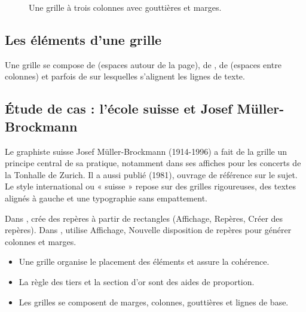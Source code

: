 \begin{figure}[ht]
\centering
{}
\caption{Une grille à trois colonnes avec gouttières et marges.}
\end{figure}

\subsection{Les éléments d'une grille}

Une grille se compose de  (espaces autour de la page), de , de  (espaces entre colonnes) et parfois de  sur lesquelles s'alignent les lignes de texte.

\subsection{Étude de cas : l'école suisse et Josef Müller-Brockmann}

Le graphiste suisse Josef Müller-Brockmann (1914-1996) a fait de la grille un principe central de sa pratique, notamment dans ses affiches pour les concerts de la Tonhalle de Zurich. Il a aussi publié  (1981), ouvrage de référence sur le sujet. Le style international ou « suisse » repose sur des grilles rigoureuses, des textes alignés à gauche et une typographie sans empattement.

\begin{astuce}
Dans , crée des repères à partir de rectangles (Affichage, Repères, Créer des repères). Dans , utilise Affichage, Nouvelle disposition de repères pour générer colonnes et marges.
\end{astuce}

\begin{retenir}
\begin{itemize}
  \item Une grille organise le placement des éléments et assure la cohérence.
  \item La règle des tiers et la section d'or sont des aides de proportion.
  \item Les grilles se composent de marges, colonnes, gouttières et lignes de base.
\end{itemize}
\end{retenir}

